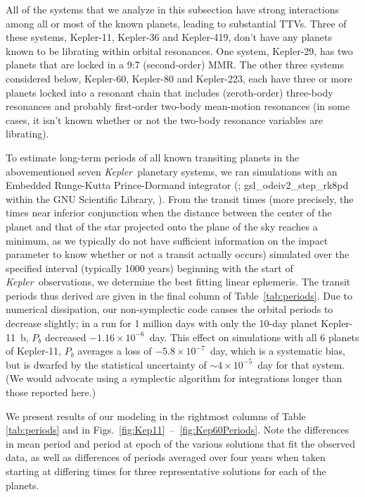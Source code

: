 \documentclass{aastex62}
\newcommand{\ik}{{\it Kepler~}}
\begin{document}
All of the systems that we analyze in this subsection have strong interactions among all or most of the known planets, leading to substantial TTVs.  Three of these systems, Kepler-11, Kepler-36 and Kepler-419, don't have any planets known to be librating within orbital resonances.  One system, Kepler-29, has two planets that are locked in a 9:7 (second-order) MMR.  The other three systems considered below, Kepler-60, Kepler-80 and Kepler-223, each have three or more planets locked into a resonant chain that includes (zeroth-order) three-body resonances and probably first-order two-body mean-motion resonances (in some cases, it isn't known whether or not the two-body resonance variables are librating).%

To estimate long-term periods of all known transiting planets in the abovementioned seven \ik planetary systems, we ran simulations with an Embedded Runge-Kutta Prince-Dormand integrator (\citealt{PD:1981}; gsl\_odeiv2\_step\_rk8pd within the GNU Scientific Library, \citealt{Gough:2009}). From the transit times (more precisely, the times near inferior conjunction when the distance between the center of the planet and that of the star projected onto the plane of the sky reaches a minimum, as we typically do not have sufficient information on the impact parameter to know whether or not a transit actually occurs) simulated over the specified interval (typically 1000 years) beginning with the start of \ik observations, we determine the best fitting linear ephemeris. The transit periods thus derived are given in the final column of Table~\ref{tab:periods}.   Due to numerical dissipation, our non-symplectic code causes the orbital periods to decrease slightly; in a run for 1 million days with only the 10-day planet Kepler-11~b, $P_b$ decreased $-1.16\times10^{-6}$~day.  This effect on simulations with all 6 planets of Kepler-11, $P_b$ averages a loss of $-5.8\times10^{-7}$~day, which is a systematic bias, but is dwarfed by the statistical uncertainty of $\sim4\times10^{-5}$~day for that system. (We would advocate using a symplectic algorithm for integrations longer than those reported here.)

We present results of our modeling in the rightmost columns of Table \ref{tab:periods} and in Figs.~\ref{fig:Kep11}~--~\ref{fig:Kep60Periods}. Note the differences in mean period and period at epoch of the various solutions that fit the observed data, as well as differences of periods averaged over four years when taken starting at differing times for three representative solutions for each of the planets.
\end{document}
